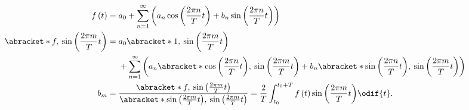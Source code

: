\documentclass{article}
\begin{document}
\begin{align*}
    f\left( t \right)                                        & = a_0 + \sum_{n=1}^{\infty} \left( a_n \cos{\left( \frac{2\pi n}{T} t \right)} + b_n \sin{\left( \frac{2\pi n}{T} t \right)} \right)                                                                                                                                     \\
    \abracket*{f,\: \sin{\left( \frac{2\pi m}{T} t \right)}} & =
                                                                 \begin{aligned}[t]
                                                                      & a_0 \abracket*{1,\: \sin{\left( \frac{2\pi m}{T} t \right)}}                                                                                                                                                                                 \\
                                                                      & + \sum_{n=1}^{\infty} \left( a_n \abracket*{\cos{\left( \frac{2\pi n}{T} t \right)},\: \sin{\left( \frac{2\pi m}{T} t \right)}} + b_n \abracket*{\sin{\left( \frac{2\pi n}{T} t \right)},\: \sin{\left( \frac{2\pi m}{T} t \right)}} \right)
                                                                 \end{aligned}
    \\
    b_m                                                      & = \frac{\abracket*{f,\: \sin{\left( \frac{2\pi m}{T} t \right)}}}{\abracket*{\sin{\left( \frac{2\pi m}{T} t \right)},\: \sin{\left( \frac{2\pi m}{T} t \right)}}} = \frac{2}{T} \int_{t_0}^{t_0 + T} f\left( t \right) \sin{\left( \frac{2\pi m}{T} t \right)} \odif{t}.
\end{align*}
\end{document}
